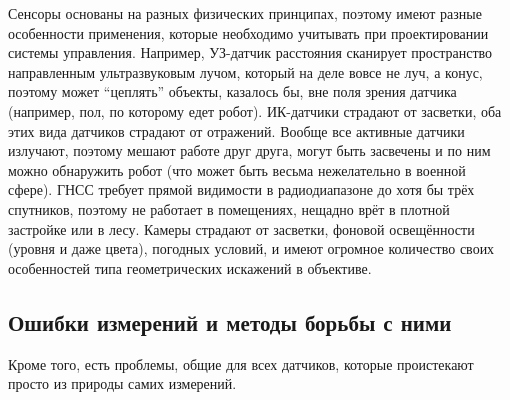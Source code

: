 \documentclass{../../text-style}
\begin{document}
Сенсоры основаны на разных физических принципах, поэтому имеют разные особенности применения, которые необходимо учитывать при проектировании системы управления.
Например, УЗ-датчик расстояния сканирует пространство направленным ультразвуковым лучом, который на деле вовсе не луч, а конус, поэтому может \enquote{цеплять} объекты, казалось бы, вне поля зрения датчика (например, пол, по которому едет робот).
ИК-датчики страдают от засветки, оба этих вида датчиков страдают от отражений.
Вообще все активные датчики излучают, поэтому мешают работе друг друга, могут быть засвечены и по ним можно обнаружить робот (что может быть весьма нежелательно в военной сфере).
ГНСС требует прямой видимости в радиодиапазоне до хотя бы трёх спутников, поэтому не работает в помещениях, нещадно врёт в плотной застройке или в лесу.
Камеры страдают от засветки, фоновой освещённости (уровня и даже цвета), погодных условий, и имеют огромное количество своих особенностей типа геометрических искажений в объективе.

\subsection{Ошибки измерений и методы борьбы с ними}

Кроме того, есть проблемы, общие для всех датчиков, которые проистекают просто из природы самих измерений.
\end{document}
